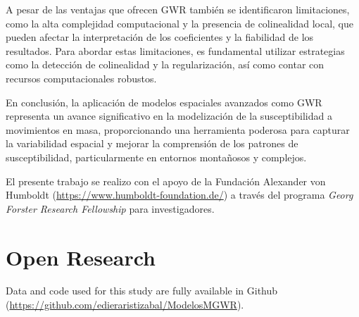 \documentclass[
  manuscript=article,  
  layout=preprint,  
]{format}
\begin{document}
A pesar de las ventajas que ofrecen GWR también se identificaron limitaciones, como la alta complejidad computacional y la presencia de colinealidad local, que pueden afectar la interpretación de los coeficientes y la fiabilidad de los resultados. Para abordar estas limitaciones, es fundamental utilizar estrategias como la detección de colinealidad y la regularización, así como contar con recursos computacionales robustos.

En conclusión, la aplicación de modelos espaciales avanzados como GWR representa un avance significativo en la modelización de la susceptibilidad a movimientos en masa, proporcionando una herramienta poderosa para capturar la variabilidad espacial y mejorar la comprensión de los patrones de susceptibilidad, particularmente en entornos montañosos y complejos.

\begin{acknowledgement}
El presente trabajo se realizo con el apoyo de la Fundación Alexander von Humboldt (\url{https://www.humboldt-foundation.de/}) a través del programa \textit{Georg Forster Research Fellowship} para investigadores.

\end{acknowledgement}

\section{Open Research}
Data and code used for this study are fully available in Github (\url{https://github.com/edieraristizabal/ModelosMGWR}).

\printbibliography
\end{document}
